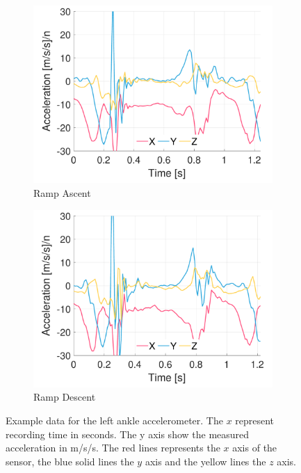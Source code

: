 \begin{figure}[p]
    \begin{subfigure}[b]{0.49\textwidth}
         \centering
         \includegraphics[width=\textwidth]{content/3-Methods/example-data/ch3_example_data_subject_01_l_ankle_accel_activity_ramp_up.pdf}
         \caption{Ramp Ascent}
    \end{subfigure}
    \begin{subfigure}[b]{0.49\textwidth}
         \centering
         \includegraphics[width=\textwidth]{content/3-Methods/example-data/ch3_example_data_subject_01_l_ankle_accel_activity_ramp_down.pdf}
         \caption{Ramp Descent}
    \end{subfigure}
    \caption[Example left ankle accelerometer data]{Example data for the left ankle accelerometer. The $x$ represent recording time in seconds. The y axis show the measured acceleration in m/s/s. The red lines represents the $x$ axis of the sensor, the blue solid lines the $y$ axis and the yellow lines the $z$ axis.}
    \label{fig:example-left-ankle-accel-sensor-data}
\end{figure}

